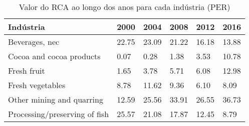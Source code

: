 \begin{table}
\centering
\caption{Valor do RCA ao longo dos anos para cada indústria (PER)}
\label{tab:ex3-tempo-PER}
\begin{tabular}{p{6cm}p{1.5cm}p{1.5cm}p{1.5cm}p{1.5cm}p{1.5cm}}
\toprule
                    Indústria &  2000 &  2004 &  2008 &  2012 &  2016 \\
\midrule
               Beverages, nec & 22.75 & 23.09 & 21.22 & 16.18 & 13.88 \\
     Cocoa and cocoa products &  0.07 &  0.28 &  1.38 &  3.53 & 10.78 \\
                  Fresh fruit &  1.65 &  3.78 &  5.71 &  6.08 & 12.98 \\
             Fresh vegetables &  8.78 & 11.62 &  9.36 &  6.10 &  8.09 \\
    Other mining and quarring & 12.59 & 25.56 & 33.91 & 26.55 & 36.73 \\
Processing/preserving of fish & 25.57 & 21.08 & 17.87 & 12.45 &  8.79 \\
\bottomrule
\end{tabular}
\end{table}
